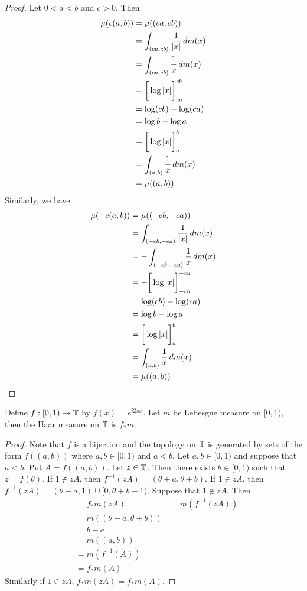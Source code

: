 \documentclass{book}
\begin{document}
	\begin{proof}
		Let $0 < a < b$ and $c >0$. Then
		\begin{align*}
			\mu(c(a, b))
			& = \mu((ca,cb)) \\
			& = \int_{(ca,cb)} \frac{1}{|x|} \, d m(x)\\
			& = \int_{(ca,cb)} \frac{1}{x} \, d m(x)\\
			& = \bigg[ \log|x| \bigg]_{ca}^{cb} \\
			& = \log(cb) - \log(ca) \\
			& = \log b - \log a \\
			& = \bigg[ \log|x| \bigg]_{a}^{b} \\ 
			& =  \int_{(a,b)} \frac{1}{x} \, d m(x)\\
			& = \mu((a,b))
		\end{align*}
	Similarly, we have
	\begin{align*}
		\mu(-c(a, b))
		& = \mu((-cb,-ca)) \\
		& = \int_{(-cb,-ca)} \frac{1}{|x|} \, d m(x)\\
		& = - \int_{(-cb,-ca)} \frac{1}{x} \, d m(x)\\
		& = - \bigg[ \log|x| \bigg]_{-cb}^{-ca} \\
		& = \log(cb) - \log(ca) \\
		& = \log b - \log a \\
		& = \bigg[ \log|x| \bigg]_{a}^{b} \\ 
		& =  \int_{(a,b)} \frac{1}{x} \, d m(x)\\
		& = \mu((a,b))
	\end{align*}
	\end{proof}

	\begin{ex}  
		Define $f: [ 0,1) \rightarrow \mathbb{T}$ by $f(x) = e^{i2 \pi x}$. Let $m$ be Lebesgue measure on $[0,1)$, then the Haar measure on $\mathbb{T}$ is $f_*m$.
	\end{ex}

	\begin{proof}
		Note that $f$ is a bijection and the topology on $\mathbb{T}$ is generated by sets of the form $f((a, b))$ where $a,b \in [0,1)$ and $a< b$. Let $a,b \in [ 0,1 )$ and suppose that $a<b$. Put $A = f((a, b))$. Let $z \in \mathbb{T}$. Then there exists $\theta \in [0, 1)$ such that $z = f(\theta)$. If $1 \not \in zA$, then $f^{-1}(zA) = (\theta + a, \theta + b)$. If $1 \in zA$, then $f^{-1}(zA) = (\theta + a , 1) \cup [0,  \theta + b - 1)$. Suppose that $1 \not \in zA$. Then
		\begin{align*}
			& = f_*m(zA) 
			& = m(f^{-1}(zA)) \\
			& = m((\theta + a, \theta + b)) \\
			& = b - a \\
			& = m((a,b)) \\
			& = m(f^{-1}(A)) \\
			& = f_*m(A)
		\end{align*}
	Similarly if $1 \in zA$, $f_*m(zA) = f_*m(A)$.
	\end{proof} 
\end{document}

